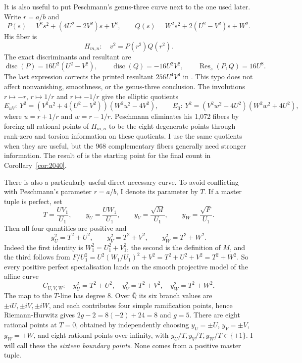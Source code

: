 \documentclass[11pt,a4paper]{amsart}
\newcommand{\Q}{\mathbb Q}
\begin{document}
It is also useful to put Peschmann's genus-three curve next to the one used later. Write $r=a/b$ and
\[
P(s)=V^2s^2+(4U^2-2V^2)s+V^2,\qquad
Q(s)=W^2s^2+2(U^2-V^2)s+W^2.
\]
His fiber is
\[
H_{m,n}:\quad v^2=P(r^2)Q(r^2).
\]
The exact discriminants and resultant are
\[
\operatorname{disc}(P)=16U^2(U^2-V^2),\qquad
\operatorname{disc}(Q)=-16U^2V^2,\qquad
\operatorname{Res}_s(P,Q)=16U^8.
\]
The last expression corrects the printed resultant $256U^4V^4$ in \cite{Pes1072}. This typo does not affect nonvanishing, smoothness, or the genus-three conclusion. The involutions $r\mapsto-r$, $r\mapsto1/r$ and $r\mapsto-1/r$ give the elliptic quotients
\[
E_{uV}:\ Y^2=(V^2u^2+4(U^2-V^2))(W^2u^2-4V^2),\qquad
E_3:\ Y^2=(V^2w^2+4U^2)(W^2w^2+4U^2),
\]
where $u=r+1/r$ and $w=r-1/r$. Peschmann eliminates his 1,072 fibers by forcing all rational points of $H_{m,n}$ to be the eight degenerate points through rank-zero and torsion information on these quotients. I use the same quotients when they are useful, but the 968 complementary fibers generally need stronger information. The result of \cite{Pes1072} is the starting point for the final count in Corollary~\ref{cor:2040}.

There is also a particularly useful direct necessary curve. To avoid conflicting with Peschmann's parameter $r=a/b$, I denote its parameter by $T$. If a master tuple is perfect, set
\[
T=\frac{UV_1}{U_1},\qquad y_U=\frac{UW_1}{U_1},\qquad
y_V=\frac{\sqrt M}{U_1},\qquad y_W=\frac{\sqrt F}{U_1}.
\]
Then all four quantities are positive and
\begin{equation}\label{eq:three-square}
y_U^2=T^2+U^2,\qquad y_V^2=T^2+V^2,\qquad y_W^2=T^2+W^2.
\end{equation}
Indeed the first identity is $W_1^2=U_1^2+V_1^2$, the second is the definition of $M$, and the third follows from $F/U_1^2=U^2(W_1/U_1)^2+V^2=T^2+U^2+V^2=T^2+W^2$. So every positive perfect specialisation lands on the smooth projective model of the affine curve
\begin{equation}\label{eq:genus-five}
C_{U,V,W}:\quad y_U^2=T^2+U^2,\quad y_V^2=T^2+V^2,\quad y_W^2=T^2+W^2.
\end{equation}
The map to the $T$-line has degree $8$. Over $\overline{\Q}$ its six branch values are $\pm iU,\pm iV,\pm iW$, and each contributes four simple ramification points, hence Riemann-Hurwitz gives $2g-2=8(-2)+24=8$ and $g=5$. There are eight rational points at $T=0$, obtained by independently choosing $y_U=\pm U$, $y_V=\pm V$, $y_W=\pm W$, and eight rational points over infinity, with $y_U/T,y_V/T,y_W/T\in\{\pm1\}$. I will call these the \emph{sixteen boundary points}. None comes from a positive master tuple.
\end{document}
